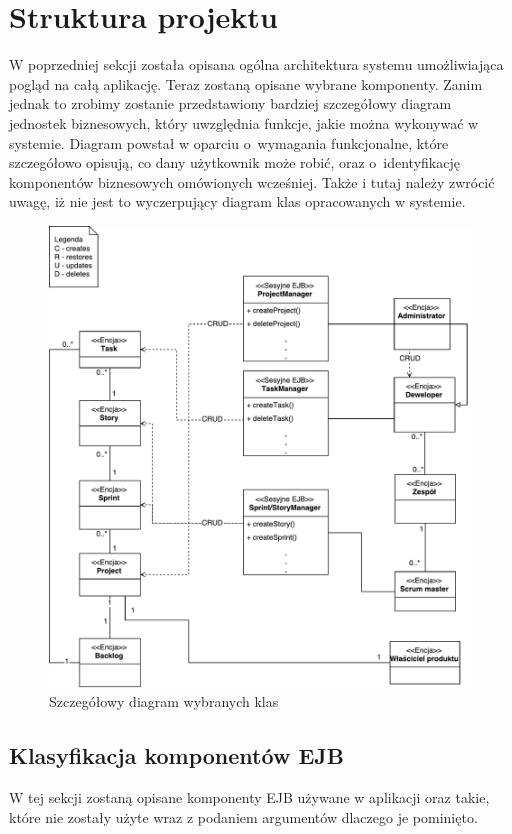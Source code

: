\section{Struktura projektu}
W poprzedniej sekcji została opisana ogólna architektura systemu umożliwiająca pogląd na całą aplikację. Teraz zostaną opisane wybrane komponenty. Zanim jednak to zrobimy zostanie przedstawiony bardziej szczegółowy diagram jednostek biznesowych, który uwzględnia funkcje, jakie można wykonywać w systemie. Diagram powstał w oparciu o~wymagania funkcjonalne, które szczegółowo opisują, co dany użytkownik może robić, oraz o~identyfikację komponentów biznesowych omówionych wcześniej. Także i tutaj należy zwrócić uwagę, iż nie jest to wyczerpujący diagram klas opracowanych w systemie.
\begin{figure}[h!]
	\centering
	\includegraphics[width=15cm]{rysunki/diagdetailuml.pdf}	
	\caption{Szczegółowy diagram wybranych klas}
	\label{fig:diagdetailuml}
\end{figure}

\subsection{Klasyfikacja komponentów EJB}
W tej sekcji zostaną opisane komponenty EJB używane w aplikacji oraz takie, które nie zostały użyte wraz z podaniem argumentów dlaczego je pominięto.

